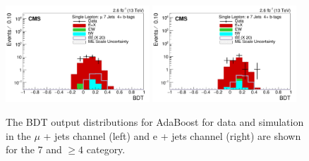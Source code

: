 \begin{figure}[ht!]
    \includegraphics[width=0.48\textwidth]{images/Run2/BDT_Mu29Aug400trees_5MinNodeSize_20nCuts_3MaxDepth_5adaboostbeta_adaBoost_alphaSTune_noMinEvents7nJets4nMtags_StackLogY.pdf}
    \includegraphics[width=0.48\textwidth]{images/Run2/BDT_El29Aug400trees_5MinNodeSize_20nCuts_3MaxDepth_5adaboostbeta_adaBoost_alphaSTune_noMinEvents7nJets4nMtags_StackLogY.pdf}
    \caption{The BDT output distributions for AdaBoost for data and simulation in the $\mu$ + jets channel (left) and e + jets channel (right) are shown for the 7 \njets and $\geq4$ \nMtags category.}
    \label{fig:BDT_Mu29Aug400trees_5MinNodeSize_20nCuts_3MaxDepth_5adaboostbeta_adaBoost_alphaSTune_noMinEvents74}
\end{figure}

